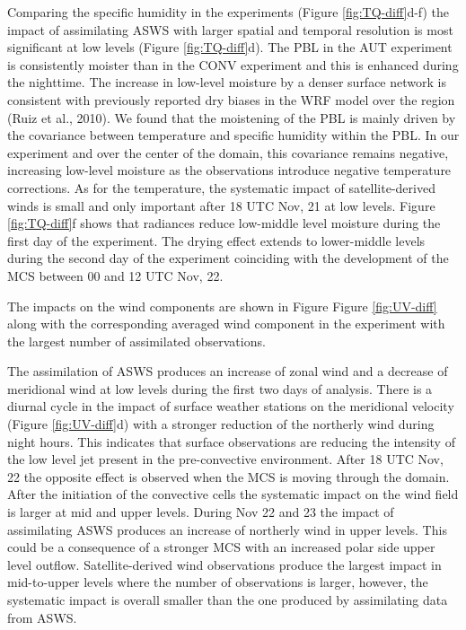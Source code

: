 \documentclass[final,5p,times,twocolumn,authoryear]{elsarticle} %
\begin{document}
Comparing the specific humidity in the experiments (Figure \ref{fig:TQ-diff}d-f) the impact of assimilating ASWS with larger spatial and temporal resolution is most significant at low levels (Figure \ref{fig:TQ-diff}d). The PBL in the AUT experiment is consistently moister than in the CONV experiment and this is enhanced during the nighttime. The increase in low-level moisture by a denser surface network is consistent with previously reported dry biases in the WRF model over the region (Ruiz et al., 2010). We found that the moistening of the PBL is mainly driven by the covariance between temperature and specific humidity within the PBL. In our experiment and over the center of the domain, this covariance remains negative, increasing low-level moisture as the observations introduce negative temperature corrections. As for the temperature, the systematic impact of satellite-derived winds is small and only important after 18 UTC Nov, 21 at low levels. Figure \ref{fig:TQ-diff}f shows that radiances reduce low-middle level moisture during the first day of the experiment. The drying effect extends to lower-middle levels during the second day of the experiment coinciding with the development of the MCS between 00 and 12 UTC Nov, 22.

The impacts on the wind components are shown in Figure Figure \ref{fig:UV-diff} along with the corresponding averaged wind component in the experiment with the largest number of assimilated observations.

The assimilation of ASWS produces an increase of zonal wind and a decrease of meridional wind at low levels during the first two days of analysis. There is a diurnal cycle in the impact of surface weather stations on the meridional velocity (Figure \ref{fig:UV-diff}d) with a stronger reduction of the northerly wind during night hours. This indicates that surface observations are reducing the intensity of the low level jet present in the pre-convective environment. After 18 UTC Nov, 22 the opposite effect is observed when the MCS is moving through the domain. After the initiation of the convective cells the systematic impact on the wind field is larger at mid and upper levels. During Nov 22 and 23 the impact of assimilating ASWS produces an increase of northerly wind in upper levels. This could be a consequence of a stronger MCS with an increased polar side upper level outflow. Satellite-derived wind observations produce the largest impact in mid-to-upper levels where the number of observations is larger, however, the systematic impact is overall smaller than the one produced by assimilating data from ASWS.
\end{document}
